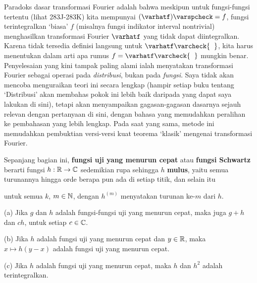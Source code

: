   

\def\rdtf{fungsi uji yang menurun cepat} \def\Ft{transformasi Fourier}

\def\chaptername{Analisis Fourier} \def\sectionname{Transformasi Fourier II}


Paradoks dasar transformasi Fourier adalah bahwa meskipun untuk fungsi-fungsi
tertentu (lihat 283J-283K) kita mempunyai $(\varhatf)\varspcheck=f$,
fungsi terintegralkan `biasa' $f$ (misalnya fungsi indikator interval
nontrivial) menghasilkan transformasi Fourier $\varhatf$ yang tidak dapat
diintegralkan. Karena tidak tersedia definisi langsung untuk
$\varhatf\varcheck{\phantom{f}}$, kita harus menentukan dalam arti apa rumus
$f=\varhatf\varcheck{\phantom{f}}$ mungkin benar. Penyelesaian yang kini
tampak paling alami ialah menyatakan transformasi Fourier sebagai operasi pada
{\it distribusi}, bukan pada {\it fungsi}. Saya tidak akan mencoba menguraikan
teori ini secara lengkap (hampir setiap buku tentang `Distribusi' akan
membahas pokok ini lebih baik daripada yang dapat saya lakukan di sini), tetapi
akan menyampaikan gagasan-gagasan dasarnya sejauh relevan dengan pertanyaan di
sini, dengan bahasa yang memudahkan peralihan ke pembahasan yang lebih lengkap.
Pada saat yang sama, metode ini memudahkan pembuktian versi-versi kuat teorema
`klasik' mengenai transformasi Fourier.

 Sepanjang bagian ini, {\bf fungsi uji yang
menurun cepat} atau {\bf fungsi Schwartz} berarti fungsi $h:\Bbb R\to\Bbb C$
sedemikian rupa sehingga $h$ {\bf mulus}, yaitu semua turunannya hingga orde
berapa pun ada di setiap titik, dan selain itu


\noindent untuk semua $k$, $m\in\Bbb N$, dengan $h^{(m)}$ menyatakan turunan
ke-$m$ dari $h$.

 (a) Jika $g$ dan $h$ adalah fungsi-fungsi uji yang
menurun cepat, maka juga $g+h$ dan $ch$, untuk setiap $c\in\Bbb C$.

(b) Jika $h$ adalah fungsi uji yang menurun cepat dan $y\in\Bbb R$, maka
$x\mapsto h(y-x)$ adalah fungsi uji yang menurun cepat.

(c) Jika $h$ adalah fungsi uji yang menurun cepat, maka $h$ dan $h^2$ adalah
terintegralkan.

